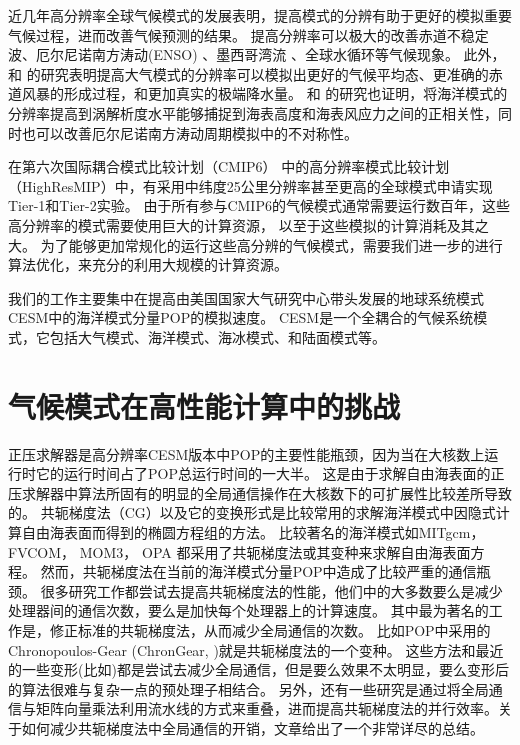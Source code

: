近几年高分辨率全球气候模式的发展表明，提高模式的分辨有助于更好的模拟重要气候过程，进而改善气候预测的结果。
提高分辨率可以极大的改善赤道不稳定波\citep{roberts2009impact}、厄尔尼诺南方涛动(ENSO) \citep{shaffrey2009uk}、墨西哥湾流\citep{chassignet2008gulf, kuwano2010precipitation} 、全球水循环\citep{demory2014role}等气候现象。
此外，\cite{gent2010improvements} 和 \cite{wehner2014effect}的研究表明提高大气模式的分辨率可以模拟出更好的气候平均态、更准确的赤道风暴的形成过程，和更加真实的极端降水量。
 \cite{bryan2010frontal} 和 \cite{graham2014importance}的研究也证明，将海洋模式的分辨率提高到涡解析度水平能够捕捉到海表高度和海表风应力之间的正相关性，同时也可以改善厄尔尼诺南方涛动周期模拟中的不对称性。


在第六次国际耦合模式比较计划（CMIP6） 中的高分辨率模式比较计划（HighResMIP）中，有采用中纬度25公里分辨率甚至更高的全球模式申请实现Tier-1和Tier-2实验。 
由于所有参与CMIP6的气候模式通常需要运行数百年，这些高分辨率的模式需要使用巨大的计算资源， 以至于这些模拟的计算消耗及其之大。
为了能够更加常规化的运行这些高分辨的气候模式，需要我们进一步的进行算法优化，来充分的利用大规模的计算资源。

 
我们的工作主要集中在提高由美国国家大气研究中心带头发展的地球系统模式CESM中的海洋模式分量POP的模拟速度。 CESM是一个全耦合的气候系统模式，它包括大气模式、海洋模式、海冰模式、和陆面模式等。


\section{气候模式在高性能计算中的挑战}
 
正压求解器是高分辨率CESM版本中POP的主要性能瓶颈，因为当在大核数上运行时它的运行时间占了POP总运行时间的一大半。 
这是由于求解自由海表面的正压求解器中算法所固有的明显的全局通信操作在大核数下的可扩展性比较差所导致的。
共轭梯度法（CG）以及它的变换形式是比较常用的求解海洋模式中因隐式计算自由海表面而得到的椭圆方程组的方法。
比较著名的海洋模式如MITgcm\citep{adcroft2014mitgcm}， FVCOM\citep{lai2010nonhydrostatic}， MOM3\citep{pacanowsky1999mom3}， OPA \citep{madec1997ocean}
都采用了共轭梯度法或其变种来求解自由海表面方程。
然而，共轭梯度法在当前的海洋模式分量POP中造成了比较严重的通信瓶颈\citep{Worley:2011:PCE:2063384.2063457}。 
很多研究工作都尝试去提高共轭梯度法的性能，他们中的大多数要么是减少处理器间的通信次数，要么是加快每个处理器上的计算速度。
其中最为著名的工作是，修正标准的共轭梯度法，从而减少全局通信的次数。 比如POP中采用的Chronopoulos-Gear (ChronGear, \cite{dAzevedo1999lapack})就是共轭梯度法的一个变种。
这些方法和最近的一些变形(比如\cite{hoemmen2010})都是尝试去减少全局通信，但是要么效果不太明显，要么变形后的算法很难与复杂一点的预处理子相结合\citep{ghysels2014}。
另外，还有一些研究是通过将全局通信与矩阵向量乘法利用流水线的方式来重叠，进而提高共轭梯度法的并行效率。关于如何减少共轭梯度法中全局通信的开销，文章\cite{ghysels2014}给出了一个非常详尽的总结。

